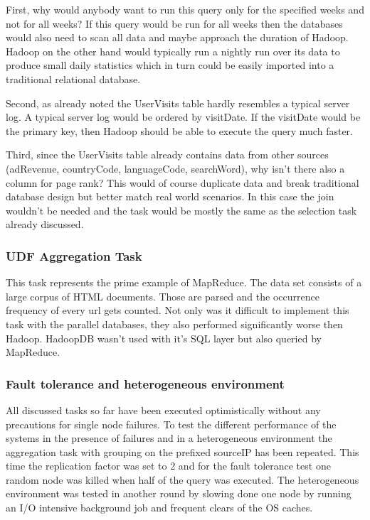 \documentclass[12pt,a4paper]{scrartcl}		%
\begin{document}
First, why would anybody want to run this query only for the specified weeks and not for all weeks? If this query would be run for all weeks then the databases would also need to scan all data and maybe approach the duration of Hadoop. Hadoop on the other hand would typically run a nightly run over its data to produce small daily statistics which in turn could be easily imported into a traditional relational database.

Second, as already noted the UserVisits table hardly resembles a typical server log. A typical server log would be ordered by visitDate. If the visitDate would be the primary key, then Hadoop should be able to execute the query much faster.

Third, since the UserVisits table already contains data from other sources (adRevenue, countryCode, languageCode, searchWord), why isn't there also a column for page rank? This would of course duplicate data and break traditional database design but better match real world scenarios. In this case the join wouldn't be needed and the task would be mostly the same as the selection task already discussed.

\subsubsection{UDF Aggregation Task}
This task represents the prime example of MapReduce. The data set consists of a large corpus of HTML documents. Those are parsed and the occurrence frequency of every url gets counted. Not only was it difficult to implement this task with the parallel databases, they also performed significantly worse then Hadoop. HadoopDB wasn't used with it's SQL layer but also queried by MapReduce. 

\subsubsection{Fault tolerance and heterogeneous environment}
All discussed tasks so far have been executed optimistically without any precautions for single node failures. To test the different performance of the systems in the presence of failures and in a heterogeneous environment the aggregation task with grouping on the prefixed sourceIP has been repeated. This time the replication factor was set to 2 and for the fault tolerance test one random node was killed when half of the query was executed. The heterogeneous environment was tested in another round by slowing done one node by running an I/O intensive background job and frequent clears of the OS caches.
\end{document}
